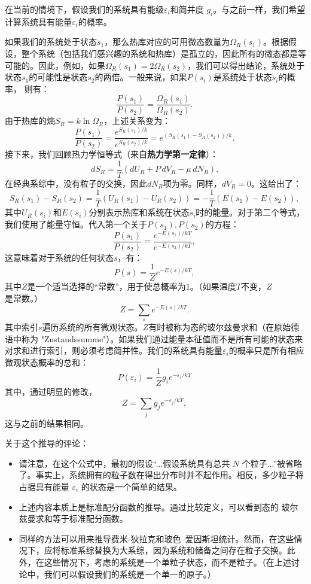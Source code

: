 在当前的情境下，假设我们的系统具有能级\( \varepsilon_i \)和简并度 \( g_i \)。与之前一样，我们希望计算系统具有能量\( \varepsilon_i \)的概率。

如果我们的系统处于状态\(s_1\)，那么热库对应的可用微态数量为\(\Omega_R(s_1)\)。根据假设，整个系统（包括我们感兴趣的系统和热库）是孤立的，因此所有的微态都是等可能的。因此，例如，如果\(\Omega_R(s_1) = 2 \Omega_R(s_2)\)，我们可以得出结论，系统处于状态\(s_1 \)的可能性是状态\(s_2\)的两倍。一般来说，如果\(P(s_i)\)是系统处于状态\(s_i\)的概率， 则有：
\[
\frac{P(s_1)}{P(s_2)} = \frac{\Omega_R(s_1)}{\Omega_R(s_2)}.~
\]
由于热库的熵\( S_R = k \ln \Omega_R \)，上述关系变为：
\[
\frac{P(s_1)}{P(s_2)} = \frac{e^{S_R(s_1)/k}}{e^{S_R(s_2)/k}} = e^{(S_R(s_1) - S_R(s_2))/k}.~
\]
接下来，我们回顾热力学恒等式（来自\textbf{热力学第一定律}）：
\[
dS_R = \frac{1}{T}(dU_R + P\,dV_R - \mu\,dN_R).~
\]
在经典系综中，没有粒子的交换，因此\( dN_R \)项为零。同样，\( dV_R = 0 \)。这给出了：
\[
S_R(s_1) - S_R(s_2) = \frac{1}{T} \left( U_R(s_1) - U_R(s_2) \right) = - \frac{1}{T} \left( E(s_1) - E(s_2) \right),~
\]
其中\( U_R(s_i) \)和\( E(s_i) \)分别表示热库和系统在状态\( s_i \)时的能量。对于第二个等式，我们使用了能量守恒。代入第一个关于\( P(s_1), P(s_2) \)的方程：
\[
\frac{P(s_1)}{P(s_2)} = \frac{e^{-E(s_1)/kT}}{e^{-E(s_2)/kT}},~
\]
这意味着对于系统的任何状态\( s \)，有：
\[
P(s) = \frac{1}{Z} e^{-E(s)/kT},~
\]
其中\( Z \)是一个适当选择的“常数”，用于使总概率为1。（如果温度\( T \)不变，\( Z \)是常数。）
\[
Z = \sum_s e^{-E(s)/kT}.~
\]
其中索引\( s \)遍历系统的所有微观状态。\( Z \)有时被称为态的玻尔兹曼求和（在原始德语中称为 "Zustandssumme"）。如果我们通过能量本征值而不是所有可能的状态来对求和进行索引，则必须考虑简并性。我们的系统具有能量\( \varepsilon_i \)的概率只是所有相应微观状态概率的总和：
\[
P(\varepsilon_i) = \frac{1}{Z} g_i e^{-\varepsilon_i / kT}~
\]
其中，通过明显的修改，
\[
Z = \sum_j g_j e^{-\varepsilon_j / kT},~
\]
这与之前的结果相同。

关于这个推导的评论：
\begin{itemize}
\item 请注意，在这个公式中，最初的假设“...假设系统具有总共 \( N \) 个粒子...”被省略了。事实上，系统拥有的粒子数在得出分布时并不起作用。相反，多少粒子将占据具有能量 \( \varepsilon_i \) 的状态是一个简单的结果。
\item 上述内容本质上是标准配分函数的推导。通过比较定义，可以看到态的 玻尔兹曼求和等于标准配分函数。
\item 同样的方法可以用来推导费米-狄拉克和玻色–爱因斯坦统计。然而，在这些情况下，应将标准系综替换为大系综，因为系统和储备之间存在粒子交换。此外，在这些情况下，考虑的系统是一个单粒子状态，而不是粒子。（在上述讨论中，我们可以假设我们的系统是一个单一的原子。）
\end{itemize}
